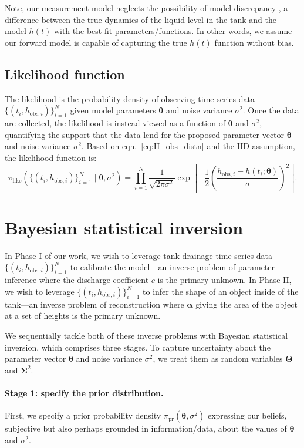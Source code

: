 \documentclass[openacc]{rsproca_new}%
\newcommand\thedata {$\{(t_i,h_{\text{obs}, i})\}_{i=1}^{N}$\xspace}
\newcommand\thedatanomath {\{(t_i,h_{\text{obs}, i})\}_{i=1}^{N}}
\begin{document}
Note, our measurement model neglects the possibility of model discrepancy \cite{brynjarsdottir2014learning,kennedy2001bayesian}, a difference between the true dynamics of the liquid level in the tank and the model $h(t)$ with the best-fit parameters/functions. In other words, we assume our forward model is capable of capturing the true $h(t)$ function without bias.


\subsection{Likelihood function}
The likelihood is the probability density of observing time series data \thedata given model parameters $\boldsymbol \theta$ and noise variance $\sigma^2$. Once the data are collected, the likelihood is instead viewed as a function of $\boldsymbol \theta$ and $\sigma^2$, quantifying the support that the data lend for the proposed parameter vector $\boldsymbol \theta$ and noise variance $\sigma^2$. Based on eqn.~\ref{eq:H_obs_distn} and the IID assumption, the likelihood function is:
\begin{equation}
 \pi_{\text{like}}(\thedatanomath \mid \boldsymbol \theta, \sigma^2 ) = \prod_{i=1}^N \frac{1}{\sqrt{2\pi\sigma^2}} \exp \left[-\frac{1}{2}\left(\frac{h_{\text{obs}, i} - h(t_i; \boldsymbol\theta)}{\sigma} \right)^2 \right]. \label{eq:like}
\end{equation}

\section{Bayesian statistical inversion}
In Phase I of our work, we wish to leverage tank drainage time series data \thedata to calibrate the model---an inverse problem of parameter inference where the discharge coefficient $c$ is the primary unknown.
In Phase II, we wish to leverage \thedata to infer the shape of an object inside of the tank---an inverse problem of reconstruction where $\boldsymbol \alpha$ giving the area of the object at a set of heights is the primary unknown. 

We sequentially tackle both of these inverse problems with Bayesian statistical inversion, which comprises three stages. To capture uncertainty about the parameter vector $\boldsymbol \theta$ and noise variance $\sigma^2$, we treat them as random variables $\boldsymbol \Theta$ and $\boldsymbol \Sigma^2$.

\paragraph{Stage 1: specify the prior distribution.}
First, we specify a prior probability density $\pi_{\text{pr}}(\boldsymbol \theta, \sigma^2)$ expressing our beliefs, subjective but also perhaps grounded in information/data, about the values of $\boldsymbol \theta$ and $\sigma^2$.
\end{document}
